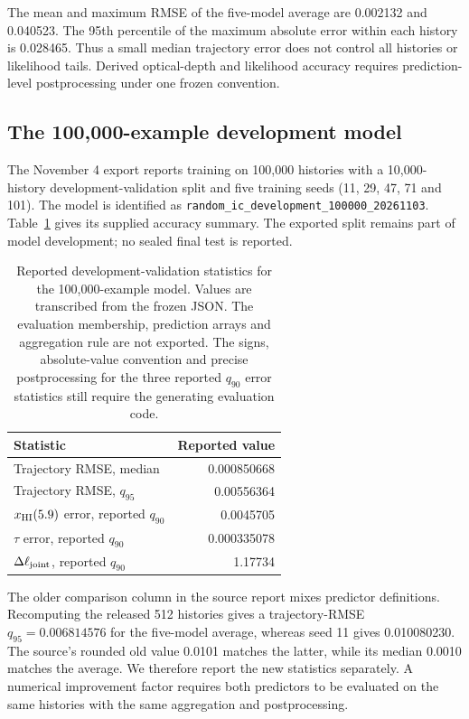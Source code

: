 The mean and maximum RMSE of the five-model average are 0.002132 and 0.040523. The 95th percentile of the maximum absolute error within each history is 0.028465. Thus a small median trajectory error does not control all histories or likelihood tails. Derived optical-depth and likelihood accuracy requires prediction-level postprocessing under one frozen convention.


\subsection{The 100,000-example development model}\label{new-model-validation}

The November 4 export reports training on 100,000 histories with a 10,000-history development-validation split and five training seeds (11, 29, 47, 71 and 101). The model is identified as \texttt{random\_ic\_development\_100000\_20261103}. Table~\ref{tab:100k-validation} gives its supplied accuracy summary. The exported split remains part of model development; no sealed final test is reported.

\begin{table}[t]\centering\small
\caption{Reported development-validation statistics for the 100,000-example model. Values are transcribed from the frozen JSON. The evaluation membership, prediction arrays and aggregation rule are not exported. The signs, absolute-value convention and precise postprocessing for the three reported $q_{90}$ error statistics still require the generating evaluation code.}\label{tab:100k-validation}
\begin{tabular}{lr}\toprule
Statistic & Reported value\\\midrule
Trajectory RMSE, median & 0.000850668\\
Trajectory RMSE, $q_{95}$ & 0.00556364\\
$x_{\rm HI}(5.9)$ error, reported $q_{90}$ & 0.0045705\\
$\tau$ error, reported $q_{90}$ & 0.000335078\\
$\Delta\ell_{\rm joint}$, reported $q_{90}$ & 1.17734\\
\bottomrule\end{tabular}\end{table}

The older comparison column in the source report mixes predictor definitions. Recomputing the released 512 histories gives a trajectory-RMSE $q_{95}=0.006814576$ for the five-model average, whereas seed 11 gives 0.010080230. The source's rounded old value 0.0101 matches the latter, while its median 0.0010 matches the average. We therefore report the new statistics separately. A numerical improvement factor requires both predictors to be evaluated on the same histories with the same aggregation and postprocessing.

